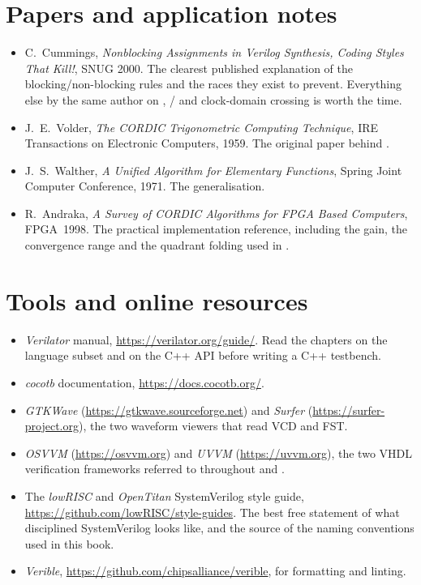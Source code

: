 \section*{Papers and application notes}

\begin{itemize}
  \item C.~Cummings, \emph{Nonblocking Assignments in Verilog Synthesis, Coding
        Styles That Kill!}, SNUG 2000. The clearest published explanation of
        the blocking/non-blocking rules and the races they exist to prevent.
        Everything else by the same author on ,
        / and clock-domain crossing is worth the
        time.
  \item J.~E.~Volder, \emph{The CORDIC Trigonometric Computing Technique},
        IRE Transactions on Electronic Computers, 1959. The original paper
        behind .
  \item J.~S.~Walther, \emph{A Unified Algorithm for Elementary Functions},
        Spring Joint Computer Conference, 1971. The generalisation.
  \item R.~Andraka, \emph{A Survey of CORDIC Algorithms for FPGA Based
        Computers}, FPGA~1998. The practical implementation reference,
        including the gain, the convergence range and the quadrant folding
        used in .
\end{itemize}

\section*{Tools and online resources}

\begin{itemize}
  \item \emph{Verilator} manual, \url{https://verilator.org/guide/}. Read the
        chapters on the language subset and on the C++ API before writing a
        C++ testbench.
  \item \emph{cocotb} documentation, \url{https://docs.cocotb.org/}.
  \item \emph{GTKWave} (\url{https://gtkwave.sourceforge.net}) and
        \emph{Surfer} (\url{https://surfer-project.org}), the two waveform
        viewers that read VCD and FST.
  \item \emph{OSVVM} (\url{https://osvvm.org}) and \emph{UVVM}
        (\url{https://uvvm.org}), the two VHDL verification frameworks
        referred to throughout  and .
  \item The \emph{lowRISC} and \emph{OpenTitan} SystemVerilog style guide,
        \url{https://github.com/lowRISC/style-guides}. The best free
        statement of what disciplined SystemVerilog looks like, and the
        source of the naming conventions used in this book.
  \item \emph{Verible}, \url{https://github.com/chipsalliance/verible}, for
        formatting and linting.
\end{itemize}
